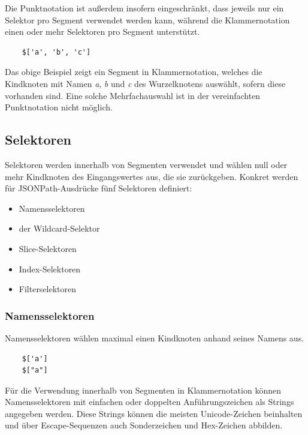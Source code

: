 \documentclass[oneside]{ausarbeitung}
\begin{document}
Die Punktnotation ist außerdem insofern eingeschränkt, dass jeweils nur ein Selektor pro Segment verwendet werden kann, während die Klammernotation einen oder mehr Selektoren pro Segment unterstützt.
	
\begin{lstlisting}
	$['a', 'b', 'c']
\end{lstlisting}
	
Das obige Beispiel zeigt ein Segment in Klammernotation, welches die Kindknoten mit Namen \textit{a}, \textit{b} und \textit{c} des Wurzelknotens auswählt, sofern diese vorhanden sind. Eine solche Mehrfachauswahl ist in der vereinfachten Punktnotation nicht möglich.
	
	
	
\subsection{Selektoren}
	
Selektoren werden innerhalb von Segmenten verwendet und wählen null oder mehr Kindknoten des Eingangswertes aus, die sie zurückgeben. Konkret werden für JSONPath-Ausdrücke fünf Selektoren definiert:
	
\begin{itemize}
	\item Namensselektoren
	\item der Wildcard-Selektor
	\item Slice-Selektoren
	\item Index-Selektoren
	\item Filterselektoren
\end{itemize}
	
	
	
\subsubsection{Namensselektoren}
	
Namensselektoren wählen maximal einen Kindknoten anhand seines Namens aus. 
	
\begin{lstlisting}
	$['a']
	$["a"]
\end{lstlisting}
	
Für die Verwendung innerhalb von Segmenten in Klammernotation können Namensselektoren mit einfachen oder doppelten Anführungszeichen als Strings angegeben werden. Diese Strings können die meisten Unicode-Zeichen beinhalten und über Escape-Sequenzen auch Sonderzeichen und Hex-Zeichen abbilden. 
	
\end{document}
